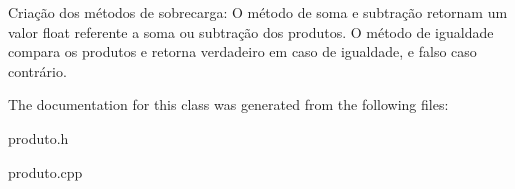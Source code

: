 Criação dos métodos de sobrecarga\+: O método de soma e subtração retornam um valor float referente a soma ou subtração dos produtos. O método de igualdade compara os produtos e retorna verdadeiro em caso de igualdade, e falso caso contrário. 

The documentation for this class was generated from the following files\+:\begin{DoxyCompactItemize}
\item 
produto.\+h\item 
produto.\+cpp\end{DoxyCompactItemize}
